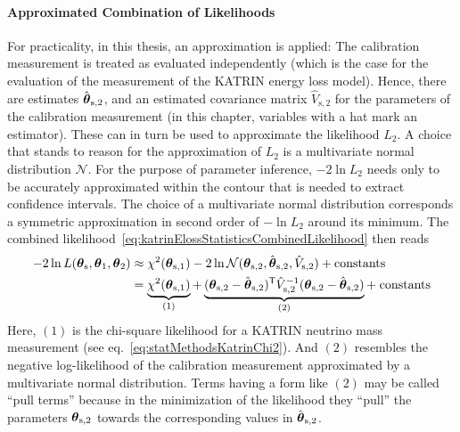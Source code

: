 \paragraph{Approximated Combination of Likelihoods}
For practicality, in this thesis, an approximation is applied: The calibration measurement is treated as evaluated independently (which is the case for the evaluation of the measurement of the KATRIN energy loss model). Hence, there are estimates $\hat{\boldsymbol{\mathbf{\theta}}}_\mathrm{s,2}$, and an estimated covariance matrix $\hat{V}_\mathrm{s,2}$ for the parameters of the calibration measurement (in this chapter, variables with a hat mark an estimator). These can in turn be used to approximate the likelihood $L_2$. A choice that stands to reason for the approximation of $L_2$ is a multivariate normal distribution $\mathcal{N}$. For the purpose of parameter inference, $-2\ln L_2$ needs only to be accurately approximated within the contour that is needed to extract confidence intervals. The choice of a multivariate normal distribution corresponds a symmetric approximation in second order of $-\ln L_2$ around its minimum. The combined likelihood~\eqref{eq:katrinElossStatisticsCombinedLikelihood} then reads
\begin{equation}
\begin{split}
\label{eq:katrinElossStatisticsPullTerm}
-2\ln L(\paramVecShared, \paramVec_1, \paramVec_2) &\approx
\chi^2(\paramVecSOne) 
-2\ln \mathcal{N}(\paramVecSTwo, \hat{\paramVec}_\mathrm{s,2}, \hat{V}_\mathrm{s,2}) +
\mathrm{ constants}\\ &=
\underbrace{
	\chi^2(\paramVecSOne)
	\vphantom{(\paramVecSTwo - \hat{\paramVec}_\mathrm{s,2})^{\mathsf{T}}}
}_{(1)}
+
\underbrace{
	(\paramVec_\mathrm{s,2} - \hat{\paramVec}_\mathrm{s,2})^{\mathsf{T}}
	\hat{V}_\mathrm{s,2}^{-1}
	(\paramVec_\mathrm{s,2} - \hat{\paramVec}_\mathrm{s,2})
}_{(2)} +\; 
\mathrm{ constants}
\end{split}
\end{equation}
Here, $(1)$ is the chi-square likelihood for a KATRIN neutrino mass measurement (see eq.~\ref{eq:statMethodsKatrinChi2}). And $(2)$ resembles the negative log-likelihood of the calibration measurement approximated by a multivariate normal distribution. Terms having a form like $(2)$ may be called ``pull terms'' because in the minimization of the likelihood they ``pull'' the parameters $\boldsymbol{\mathbf{\theta}}_\mathrm{s,2}$ towards the corresponding values in $\hat{\boldsymbol{\mathbf{\theta}}}_\mathrm{s,2}$.

